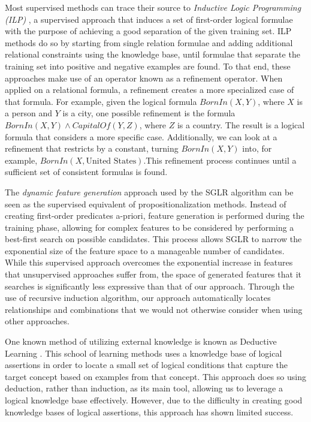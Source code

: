 \documentclass[twoside,11pt]{article}
\theoremstyle{definition}
\begin{document}
	Most supervised methods can trace their source to \emph{Inductive Logic Programming (ILP)} \cite{muggleton1991inductive}, a supervised approach that induces a set of first-order logical formulae with the purpose of achieving a good separation of the given training set. 
	ILP methods do so by starting from single relation formulae and adding additional relational constraints using the knowledge base, until formulae that separate the training set into positive and negative examples are found. To that end, these approaches make use of an operator known as a refinement operator. When applied on a relational formula, a refinement creates a more specialized case of that formula. For example, given the logical formula $BornIn(X,Y)$, where $X$ is a person and $Y$ is a city, one possible refinement is the formula $BornIn(X,Y)\land CapitalOf(Y,Z)$, where $Z$ is a country. The result is a logical formula that considers a more specific case. Additionally, we can look at a refinement that restricts by a constant, turning $BornIn(X,Y)$ into, for example, $BornIn(X, \mbox{{United States}})$.This refinement process continues until a sufficient set of consistent formulas is found. 

The \emph{dynamic feature generation} approach used by the SGLR algorithm \cite{popescul200716} can be seen as the supervised equivalent of propositionalization methods. Instead of creating first-order predicates a-priori, feature generation is performed during the training phase, allowing for complex features to be considered by performing a best-first search on possible candidates.
This process allows SGLR to narrow the exponential size of the feature space to a manageable number of candidates.
While this supervised approach overcomes the exponential increase in features that unsupervised approaches suffer from, the space of generated features that it searches is significantly less expressive than that of our approach.
Through the use of recursive induction algorithm, our approach automatically locates relationships and combinations that we would not otherwise consider when using other approaches.

One known method of utilizing external knowledge is known as Deductive Learning . This school of learning methods uses a knowledge base of logical assertions in order to locate a small set of logical conditions that capture the target concept based on examples from that concept. This approach does so using deduction, rather than induction, as its main tool, allowing us to leverage a logical knowledge base effectively.
However, due to the difficulty in creating good knowledge bases of logical assertions, this approach has shown limited success.
\end{document}
